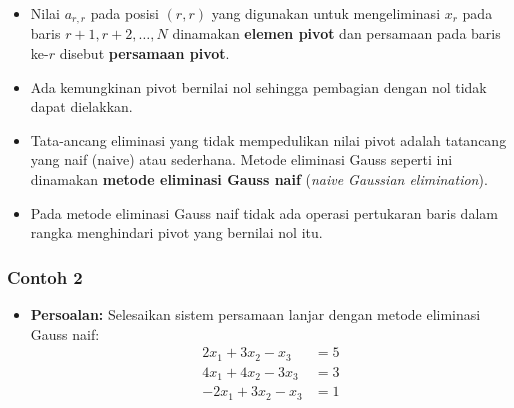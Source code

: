 \documentclass[pdflatex,compress,mathserif]{beamer}
\begin{document}
\begin{frame}
	\begin{itemize}
		\item Nilai $ a_{r, r} $ pada posisi $ (r, r) $ yang digunakan untuk mengeliminasi $ x_r $ pada baris $ r + 1, r + 2, \dots, N $ dinamakan \textbf{elemen pivot} dan persamaan pada baris ke-$ r $ disebut \textbf{persamaan pivot}.
		\item Ada kemungkinan pivot bernilai nol sehingga pembagian dengan nol tidak dapat dielakkan.
		\item Tata-ancang eliminasi yang tidak mempedulikan nilai pivot adalah tatancang yang naif (naive) atau sederhana. Metode eliminasi Gauss seperti ini dinamakan \textbf{metode eliminasi Gauss naif} (\textit{naive Gaussian elimination}).
		\item Pada metode eliminasi Gauss naif tidak ada operasi pertukaran baris dalam rangka menghindari pivot yang bernilai nol itu.
	\end{itemize}
\end{frame}

\begin{frame}
	\frametitle{Contoh 2}
	\begin{itemize}
		\item \textbf{Persoalan:}  Selesaikan sistem persamaan lanjar dengan metode eliminasi Gauss naif:
		\begin{align*}
			2x_1 + 3x_2 - x_3 &= 5 \\
			4x_1 + 4x_2 - 3x_3 &= 3 \\
			-2x_1 + 3x_2 - x_3 &= 1
		\end{align*}
	\end{itemize}
\end{frame}
\end{document}
